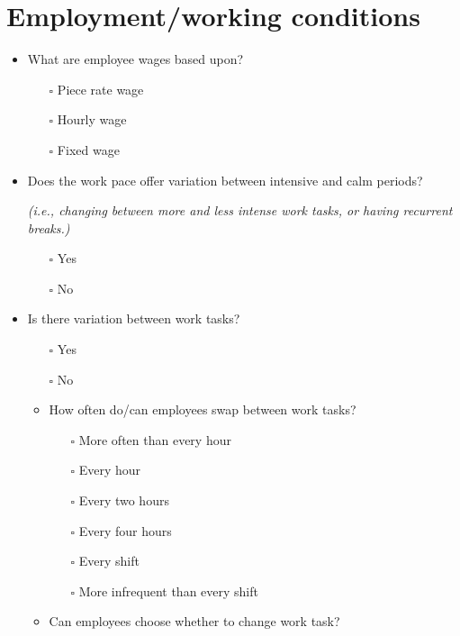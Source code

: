 \documentclass[
  12pt,
]{scrbook}
\providecommand{\tightlist}{%
  \setlength{\itemsep}{0pt}\setlength{\parskip}{0pt}}
\begin{document}
\hypertarget{employmentworking-conditions}{%
\section*{Employment/working conditions}\label{employmentworking-conditions}}

\begin{itemize}
\item
  What are employee wages based upon?

  \begin{itemize}
  \tightlist
  \item[$\square$]
    Piece rate wage
  \item[$\square$]
    Hourly wage
  \item[$\square$]
    Fixed wage
  \end{itemize}
\item
  Does the work pace offer variation between intensive and calm periods?

  \emph{(i.e., changing between more and less intense work tasks, or having recurrent breaks.)}

  \begin{itemize}
  \tightlist
  \item[$\square$]
    Yes
  \item[$\square$]
    No
  \end{itemize}
\item
  Is there variation between work tasks?

  \begin{itemize}
  \item[$\square$]
    Yes
  \item[$\square$]
    No
  \item
    How often do/can employees swap between work tasks?

    \begin{itemize}
    \tightlist
    \item[$\square$]
      More often than every hour
    \item[$\square$]
      Every hour
    \item[$\square$]
      Every two hours
    \item[$\square$]
      Every four hours
    \item[$\square$]
      Every shift
    \item[$\square$]
      More infrequent than every shift
    \end{itemize}
  \item
    Can employees choose whether to change work task?


\end{itemize}
\end{itemize}
\end{document}

